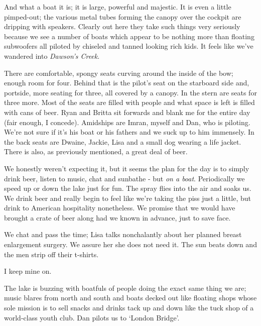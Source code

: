 \documentclass[a5paper,titlepage,11pt,draft]{book}
\begin{document}
And what a boat it is; it is large, powerful and majestic.  It is even a little pimped-out; the various metal tubes forming the canopy over the cockpit are dripping with speakers.  Clearly out here they take such things very seriously because we see a number of boats which appear to be nothing more than floating subwoofers all piloted by chiseled and tanned looking rich kids.  It feels like we've wandered into \emph{Dawson's Creek}.

There are comfortable, spongy seats curving around the inside of the bow; enough room for four.  Behind that is the pilot's seat on the starboard side and, portside, more seating for three, all covered by a canopy.  In the stern are seats for three more.  Most of the seats are filled with people and what space is left is filled with cans of beer.  Ryan and Britta sit forwards and blank me for the entire day (fair enough, I concede).  Amidships are Imran, myself and Dan, who is piloting.  We're not sure if it's his boat or his fathers and we suck up to him immensely.  In the back seats are Dwaine, Jackie, Lisa and a small dog wearing a life jacket.  There is also, as previously mentioned, a great deal of beer.

We honestly weren't expecting it, but it seems the plan for the day is to simply drink beer, listen to music, chat and sunbathe - but \emph{on a boat}.  Periodically we speed up or down the lake just for fun.  The spray flies into the air and soaks us.  We drink beer and really begin to feel like we're taking the piss just a little, but drink to American hospitality nonetheless.  We promise that we would have brought a crate of beer along had we known in advance, just to save face.


We chat and pass the time; Lisa talks nonchalantly about her planned breast enlargement surgery.  We assure her she does not need it.  The sun beats down and the men strip off their t-shirts.

I keep mine on.

The lake is buzzing with boatfuls of people doing the exact same thing we are; music blares from north and south and boats decked out like floating shops whose sole mission is to sell snacks and drinks tack up and down like the tuck shop of a world-class youth club.  Dan pilots us to `London Bridge'.
\end{document}
